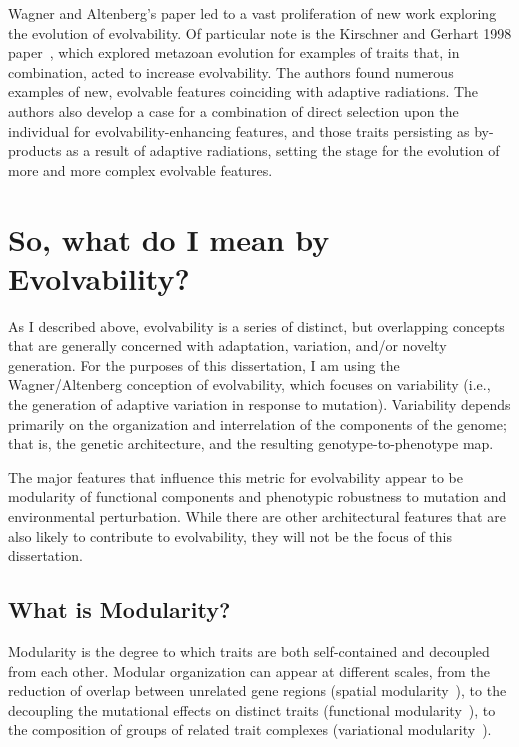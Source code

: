 \documentclass[PhD]{msu-thesis}
\begin{document}
Wagner and Altenberg’s paper led to a vast proliferation of new work exploring the evolution of evolvability. Of particular note is the Kirschner and Gerhart 1998 paper~\cite{kirschner_evolvability_1998}, which explored metazoan evolution for examples of traits that, in combination, acted to increase evolvability. The authors found numerous examples of new, evolvable features coinciding with adaptive radiations. The authors also develop a case for a combination of direct selection upon the individual for evolvability-enhancing features, and those traits persisting as by-products as a result of adaptive radiations, setting the stage for the evolution of more and more complex evolvable features.




\section{So, what do I mean by Evolvability?}
As I described above, evolvability is a series of distinct, but overlapping concepts that are generally concerned with adaptation, variation, and/or novelty generation. For the purposes of this dissertation, I am using the Wagner/Altenberg conception of evolvability, which focuses on variability (i.e., the generation of adaptive variation in response to mutation). Variability depends primarily on the organization and interrelation of the components of the genome; that is, the genetic architecture, and the resulting genotype-to-phenotype map.

The major features that influence this metric for evolvability appear to be modularity of functional components and phenotypic robustness to mutation and environmental perturbation. While there are other architectural features that are also likely to contribute to evolvability, they will not be the focus of this dissertation.



\subsection{What is Modularity?}
Modularity is the degree to which traits are both self-contained and decoupled from each other. Modular organization can appear at different scales, from the reduction of overlap between unrelated gene regions (spatial modularity~\cite{misevic_sexual_2006}), to the decoupling the mutational effects on distinct traits (functional modularity~\cite{gunter_p._wagner_perspective:_1996}), to the composition of groups of related trait complexes (variational modularity~\cite{gunter_p._wagner_pleiotropic_2011,ravasz_hierarchical_2002}).
\end{document}
